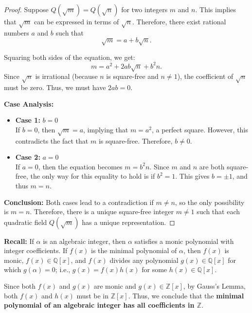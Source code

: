 \documentclass{article}
\begin{document}
    \begin{proof}
        Suppose \( Q(\sqrt{m}) = Q(\sqrt{n}) \) for two integers \( m \) and \( n \). This implies that \( \sqrt{m} \) can be expressed in terms of \( \sqrt{n} \). Therefore, there exist rational numbers \( a \) and \( b \) such that
        \[
        \sqrt{m} = a + b \sqrt{n}.
        \]
        
        \noindent Squaring both sides of the equation, we get:
        \[
        m = a^2 + 2ab \sqrt{n} + b^2 n.
        \]
        Since \( \sqrt{n} \) is irrational (because \( n \) is square-free and \( n \neq 1 \)), the coefficient of \( \sqrt{n} \) must be zero. Thus, we must have \( 2ab = 0 \).
        
        \noindent \textbf{Case Analysis:}
        \begin{itemize}
            \item \textbf{Case 1:} \( b = 0 \) \\
            If \( b = 0 \), then \( \sqrt{m} = a \), implying that \( m = a^2 \), a perfect square. However, this contradicts the fact that \( m \) is square-free. Therefore, \( b \neq 0 \).
        
            \item \textbf{Case 2:} \( a = 0 \) \\
            If \( a = 0 \), then the equation becomes \( m = b^2 n \). Since \( m \) and \( n \) are both square-free, the only way for this equality to hold is if \( b^2 = 1 \). This gives \( b = \pm 1 \), and thus \( m = n \).
        \end{itemize}
        
        \noindent \textbf{Conclusion:} Both cases lead to a contradiction if \( m \neq n \), so the only possibility is \( m = n \). Therefore, there is a unique square-free integer \( m \neq 1 \) such that each quadratic field \( Q(\sqrt{m}) \) has a unique representation.
    \end{proof}

    \noindent \textbf{Recall:} If $\alpha$ is an algebraic integer, then $\alpha$ satisfies a monic polynomial with integer coefficients. If $f(x)$ is the minimal polynomial of $\alpha$, then $f(x)$ is monic, \( f(x) \in \mathbb{Q}[x] \), and \( f(x) \) divides any polynomial \( g(x) \in \mathbb{Q}[x] \) for which \( g(\alpha) = 0 \); i.e., \( g(x) = f(x)h(x) \) for some \( h(x) \in \mathbb{Q}[x] \).

Since both \( f(x) \) and \( g(x) \) are monic and \( g(x) \in \mathbb{Z}[x] \), by Gauss's Lemma, both \( f(x) \) and \( h(x) \) must be in \( \mathbb{Z}[x] \). Thus, we conclude that the \textbf{minimal polynomial of an algebraic integer has all coefficients in \( \mathbb{Z} \)}.
\end{document}
